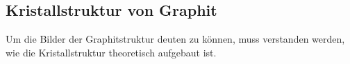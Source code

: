 \subsection{Kristallstruktur von Graphit}
Um die Bilder der Graphitstruktur deuten zu können, muss verstanden werden, wie die Kristallstruktur theoretisch aufgebaut ist.         

